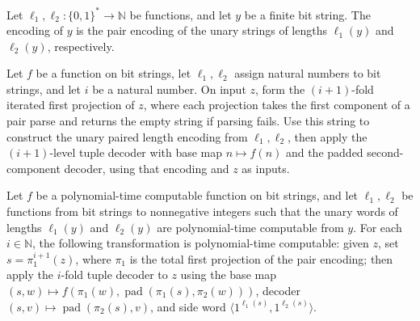 \begin{definition}
\label{Complexity.PolyHierarchy.nSide}
\leanok
{}
Let $\ell_1,\ell_2 : \{0,1\}^* \to \mathbb{N}$ be functions, and let $y$ be a finite bit
string. The encoding of $y$ is the pair encoding of the unary strings of lengths
$\ell_1(y)$ and $\ell_2(y)$, respectively.
\end{definition}

\begin{definition}
\label{Complexity.PolyHierarchy.nMap}
\leanok
{}
Let $f$ be a function on bit strings, let $\ell_1,\ell_2$ assign natural numbers to bit
strings, and let $i$ be a natural number. On input $z$, form the $(i+1)$-fold iterated
first projection of $z$, where each projection takes the first component of a pair parse
and returns the empty string if parsing fails. Use this string to construct the unary
paired length encoding from $\ell_1,\ell_2$, then apply the $(i+1)$-level tuple decoder
with base map $n\mapsto f(n)$ and the padded second-component decoder, using that
encoding and $z$ as inputs.
\end{definition}

\begin{theorem}
\label{Complexity.PolyHierarchy.polyTimeComputable_nMap}
\leanok
{}
Let $f$ be a polynomial-time computable function on bit strings, and let $\ell_1,\ell_2$
be functions from bit strings to nonnegative integers such that the unary words of
lengths $\ell_1(y)$ and $\ell_2(y)$ are polynomial-time computable from $y$. For each
$i\in\mathbb N$, the following transformation is polynomial-time computable: given $z$,
set $s=\pi_1^{i+1}(z)$, where $\pi_1$ is the total first projection of the pair
encoding; then apply the $i$-fold tuple decoder to $z$ using the base map $(s,w)\mapsto
f(\pi_1(w),\operatorname{pad}(\pi_1(s),\pi_2(w)))$, decoder
$(s,v)\mapsto\operatorname{pad}(\pi_2(s),v)$, and side word $\langle
1^{\ell_1(s)},1^{\ell_2(s)}\rangle$.
\end{theorem}

